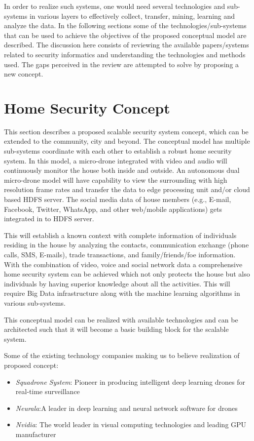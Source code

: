 \documentclass[sigconf]{acmart}
\begin{document}
In order to realize such systems, one would need several technologies and sub-systems in various layers to effectively collect, transfer, mining, learning and analyze the data. In the following sections some of the technologies/sub-systems that can be used to achieve the objectives of the proposed conceptual model are described.
The discussion here consists of reviewing the available papers/systems related to security informatics and understanding the technologies and methods used. The gaps perceived in the review are attempted to solve by proposing a new concept. 

\section{Home Security Concept}
This section describes a proposed scalable security system concept, which can be extended to the community, city and beyond.  The conceptual model has multiple sub-systems coordinate with each other to establish a robust home security system. In this model, a micro-drone integrated with video and audio will continuously monitor the house both inside and outside. An autonomous dual micro-drone model will have capability to view the surrounding with high resolution frame rates and transfer the data to edge processing unit and/or cloud based HDFS server. The social media data of house members (e.g., E-mail, Facebook, Twitter, WhatsApp, and other web/mobile applications) gets integrated in to HDFS server.

This will establish a known context with complete information of individuals residing in the house by analyzing the contacts, communication exchange (phone calls, SMS, E-mails), trade transactions, and family/friends/foe information. With the combination of video, voice and social network data a comprehensive home security system can be achieved which not only protects the house but also individuals by having superior knowledge about all the activities. This will require Big Data infrastructure along with the machine learning algorithms in various sub-systems.

This conceptual model can be realized with available technologies and can be architected such that it will become a basic building block for the scalable system.

Some of the existing technology companies making us to believe realization of proposed concept:
 \begin{itemize}
    \item \textit{Squadrone System}: Pioneer in producing intelligent deep learning drones for real-time surveillance
    \item \textit{Neurala}:A leader in deep learning and neural network software for drones
    \item \textit{Nvidia}: The world leader in visual computing technologies and leading GPU manufacturer
 \end{itemize}
\end{document}
